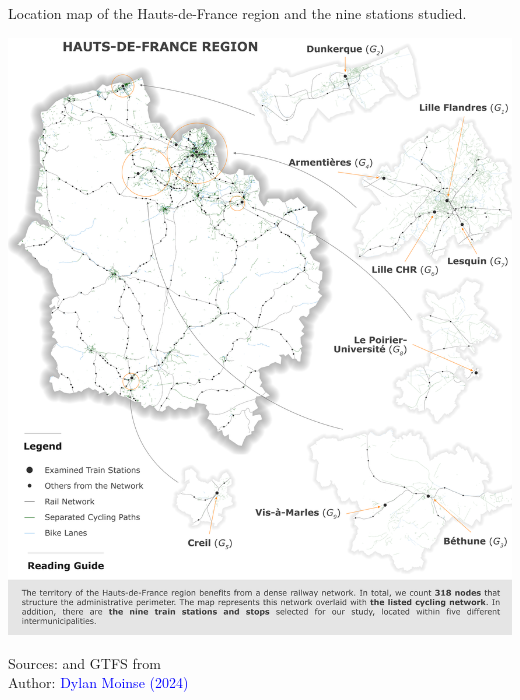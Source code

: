 \begin{refsegment}
    \begin{carte}[h!]%
    \caption{Location map of the Hauts-de-France region and the nine stations studied.}
    \label{fig-chap3:gares-examinees}
    \centerline{\includegraphics[width=1\columnwidth]{src/Figures/Chap-3/EN_Carte_situation_gares_examinees.png}}
    \vspace{5pt}
    \begin{flushright}\scriptsize{
    Sources: \textcolor{blue}{\textcite{openstreetmap_openstreetmap_2023}} and \acrshort{GTFS} from \textcolor{blue}{\textcite{sncf_reseau_2024}}
    \\
    Author: \textcolor{blue}{Dylan Moinse (2024)}
    }\end{flushright}
    \end{carte}


\end{refsegment}
